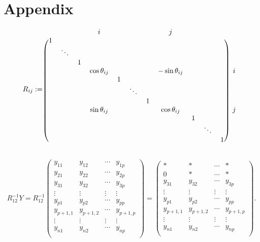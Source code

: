 \documentclass{article}
\begin{document}
\section*{Appendix}
\[
R_{ij} := 
\begin{blockarray}{cccccccccccc}
 & & & i &  & & & j & & \\
\begin{block}{(ccccccccccc)c}
  1 &  &  &  &  & & & &  & & &  \\
   & \ddots &  &  & & & & &  & & &  \\
   &  & 1  &  &  & & & &  & & & \\
   & & & \cos \theta_{ij} &  & &  & -\sin \theta_{ij} &  & & & i \\
   & & & & 1  & &  & &  & & & \\
   & & &  & & \ddots  &  & &  & & &  \\
   & & &  & & & 1 & &  & & &  \\
   & & & \sin \theta_{ij}  &  & &  & \cos \theta_{ij} &  & & & j \\
   & & &  &  & &  & & 1 & & & \\
   & & &  &  & &  & & & \ddots & & \\
      & & &  &  & &  & & & & 1 & \\
\end{block}
\end{blockarray}
 \]

\begin{equation}
R_{12}^{-1} Y 
=
R_{12}^{-1}
\begin{pmatrix}
y_{11} & y_{12} & \cdots & y_{1p}\\
y_{21} & y_{22} & \cdots & y_{2p}\\
y_{31} & y_{32} & \cdots & y_{3p}\\
\vdots & \vdots & \vdots & \vdots\\
y_{p1} & y_{p2} & \cdots & y_{pp}\\
y_{p+1,1} & y_{p+1,2} & \cdots & y_{p+1,p}\\
\vdots & \vdots & \vdots & \vdots\\
y_{n1} & y_{n2} & \cdots & y_{np}\\
\end{pmatrix}
=
\begin{pmatrix}
* & * & \cdots & *\\
0 & * & \cdots & *\\
y_{31} & y_{32} & \cdots & y_{3p}\\
\vdots & \vdots & \vdots & \vdots\\
y_{p1} & y_{p2} & \cdots & y_{pp}\\
y_{p+1,1} & y_{p+1,2} & \cdots & y_{p+1,p}\\
\vdots & \vdots & \vdots & \vdots\\
y_{n1} & y_{n2} & \cdots & y_{np}\\
\end{pmatrix}.
\end{equation}
\end{document}
